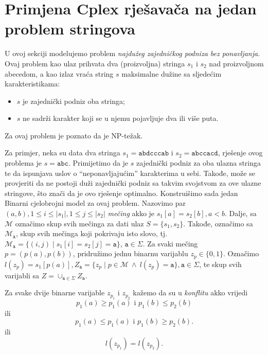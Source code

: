 \documentclass[a4paper, utf8, 11pt, colorlinks]{book}
\begin{document}
 \section{Primjena Cplex rješavača na jedan problem stringova}
 
 U ovoj sekciji modelujemo problem \emph{najdužeg zajedničkog podniza bez ponavljanja}. Ovaj problem kao ulaz prihvata dva (proizvoljna) stringa $s_1$ i $s_2$ nad proizvoljnom abecedom, a kao izlaz vraća string $s$ maksimalne dužine sa sljedećim karakteristikama:  
 \begin{itemize}
 	\item $s$ je zajednički podniz oba stringa; 
 	\item $s$ ne sadrži karakter koji se u njemu pojavljuje dva ili više puta.
 \end{itemize}
Za ovaj problem je poznato da je NP-težak. 

Za primjer, neka su data dva stringa $s_1 = \texttt{abdcccab}$ i $s_2=\texttt{abccacd}$, rješenje ovog problema je $s=\texttt{abc}$. Primijetimo da je $s$ zajednički podniz za oba ulazna stringa te da ispunjava uslov o ``neponavljajućim'' karakterima u sebi. Takođe, može se provjeriti da ne postoji duži zajednički podniz sa takvim svojstvom za ove ulazne stringove, što znači da je ovo rješenje optimalno. Konstruišimo sada jedan Binarni cjelobrojni model za ovaj problem. Nazovimo par $(a, b), 1 \leq i \leq |s_1|, 1 \leq j \leq |s_2|$ \emph{mečing} akko je $s_1[a]=s_2[b], a < b$. Dalje, sa $\mathcal{M}$ označimo skup svih mečinga za dati ulaz $S=\{s_1, s_2\}$. Takođe, označimo sa  $\mathcal{M}_{\texttt{a}}$, skup svih mečinga koji pokrivaju isto slovo, tj. 
$\mathcal{M}_{\texttt{a}} = \{ (i, j) \mid s_1[i]=s_2[j]=\texttt{a}\}$, $\texttt{a} \in \Sigma$. Za svaki mečing $p=(p(a),p(b))$, pridružimo jednu binarnu varijablu $z_{p} \in \{0, 1\}$. Označimo $l(z_p)= s_1[ p(a) ], Z_{\texttt{a}} = \{ z_p \mid p \in \mathcal{M} \ \wedge\  l(z_p) = \texttt{a}\}, \texttt{a}\in \Sigma$, te skup svih varijabli sa $Z = \cup_{\texttt{a} \in \Sigma} Z_{\texttt{a}}$. 

Za svake dvije binarne varijable $z_{p_1}$ i $z_{p_2}$ kažemo da su u \emph{konflitu} akko vrijedi $$ p_1(a) \geq p_1(a) \mbox{ i } p_1(b) \leq p_2(b)     $$ 
ili 
 $$ p_1(a) \leq p_1(a) \mbox{ i } p_1(b) \geq p_2(b).$$ 
ili 
$$ l(z_{p_1}) = l(z_{p_2}).$$
\end{document}
